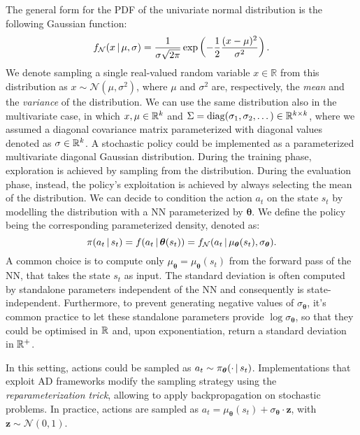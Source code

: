\begin{example*}
%
\label{example:diagonal_gaussian_policy}
The general form for the \ac{PDF} of the univariate normal distribution is the following Gaussian function:
%
\begin{equation}
    \label{eq:gaussian_function}
    f_{\mathcal{N}}(x \operatorname{\mid} \mu, \sigma)
    = \frac{1}{\sigma \sqrt{2\pi}} \exp \left( -\frac{1}{2}\frac{(x - \mu)^2}{\sigma^2} \right).
\end{equation}
%
We denote sampling a single real-valued random variable $x \in \mathbb{R}$ from this distribution as $x \sim \mathcal{N}(\mu, \sigma^2)$, where $\mu$ and $\sigma^2$ are, respectively, the \emph{mean} and the \emph{variance} of the distribution.
We can use the same distribution also in the multivariate case, in which $x, \mu \in \mathbb{R}^k$ and $\Sigma = \operatorname{diag}(\sigma_1, \sigma_2, \dots) \in \mathbb{R}^{k\times k}$, where we assumed a diagonal covariance matrix parameterized with diagonal values denoted as $\sigma \in \mathbb{R}^k$.
A stochastic policy could be implemented as a parameterized multivariate diagonal Gaussian distribution.
During the training phase, exploration is achieved by sampling from the distribution.
During the evaluation phase, instead, the policy's exploitation is achieved by always selecting the mean of the distribution.
We can decide to condition the action $a_t$ on the state $s_t$ by modelling the distribution with a \ac{NN} parameterized by $\boldsymbol{\theta}$.
We define the policy being the corresponding parameterized density, denoted as:
%
\begin{equation*}
    \pi(a_t \operatorname{\mid} s_t) = 
    f(a_t \operatorname{\mid} \boldsymbol{\theta}(s_t)) = f_{\mathcal{N}}(a_t \operatorname{\mid} \mu_{\boldsymbol{\theta}}(s_t), \sigma_{\boldsymbol{\theta}})
    .
\end{equation*}
%
A common choice is to compute only $\mu_{\boldsymbol{\theta}} =\mu_{\boldsymbol{\theta}}(s_t) $ from the forward pass of the \ac{NN}, that takes the state $s_t$ as input.
The standard deviation is often computed by standalone parameters independent of the \ac{NN} and consequently is state-independent.
Furthermore, to prevent generating negative values of $\sigma_{\boldsymbol{\theta}}$, it's common practice to let these standalone parameters provide $\log \sigma_{\boldsymbol{\theta}}$, so that they could be optimised in $\mathbb{R}$ and, upon exponentiation, return a standard deviation in $\mathbb{R}^+$.

In this setting, actions could be sampled as $a_t \sim \pi_{\boldsymbol{\theta}}(\cdot \operatorname{\mid} s_t)$.
Implementations that exploit \ac{AD} frameworks modify the sampling strategy using the \emph{reparameterization trick}, allowing to apply backpropagation on stochastic problems.
In practice, actions are sampled as $a_t =
\mu_{\boldsymbol{\theta}}(s_t) + \sigma_{\boldsymbol{\theta}} \cdot \boldsymbol{z}$, with $\boldsymbol{z} \sim \mathcal{N}(0, 1)$.
%
\end{example*}

